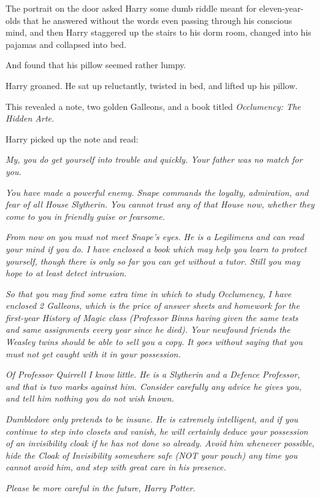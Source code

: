 The portrait on the door asked Harry some dumb riddle meant for
eleven-year-olds that he answered without the words even passing through
his conscious mind, and then Harry staggered up the stairs to his dorm
room, changed into his pajamas and collapsed into bed.

And found that his pillow seemed rather lumpy.

Harry groaned. He sat up reluctantly, twisted in bed, and lifted up his
pillow.

This revealed a note, two golden Galleons, and a book titled
\emph{Occlumency: The Hidden Arte.}

Harry picked up the note and read:

\emph{My, you do get yourself into trouble and quickly. Your father was
no match for you.}

\emph{You have made a powerful enemy. Snape commands the loyalty,
admiration, and fear of all House Slytherin. You cannot trust any of
that House now, whether they come to you in friendly guise or fearsome.}

\emph{From now on you must not meet Snape's eyes. He is a Legilimens and
can read your mind if you do. I have enclosed a book which may help you
learn to protect yourself, though there is only so far you can get
without a tutor. Still you may hope to at least detect intrusion.}

\emph{So that you may find some extra time in which to study Occlumency,
I have enclosed 2 Galleons, which is the price of answer sheets and
homework for the first-year History of Magic class (Professor Binns
having given the same tests and same assignments every year since he
died). Your newfound friends the Weasley twins should be able to sell
you a copy. It goes without saying that you must not get caught with it
in your possession.}

\emph{Of Professor Quirrell I know little. He is a Slytherin and a
Defence Professor, and that is two marks against him. Consider carefully
any advice he gives you, and tell him nothing you do not wish known.}

\emph{Dumbledore only pretends to be insane. He is extremely
intelligent, and if you continue to step into closets and vanish, he
will certainly deduce your possession of an invisibility cloak if he has
not done so already. Avoid him whenever possible, hide the Cloak of
Invisibility somewhere safe (NOT your pouch) any time you cannot avoid
him, and step with great care in his presence.}

\emph{Please be more careful in the future, Harry Potter.}

